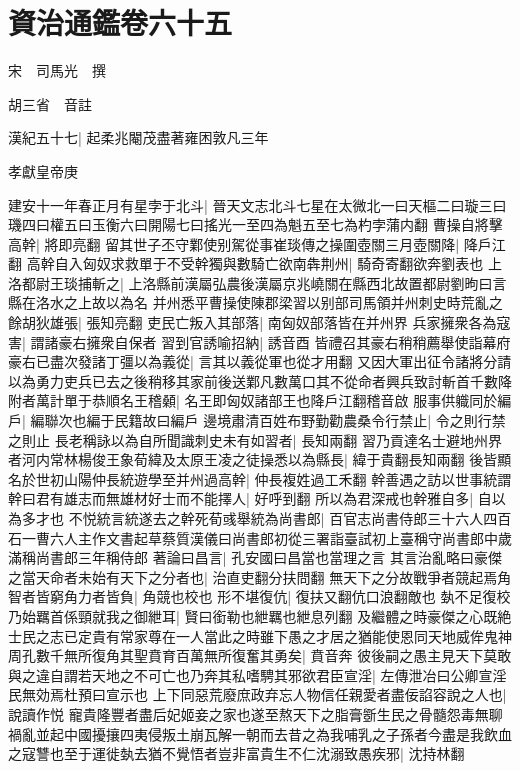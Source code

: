 \chapter{資治通鑑卷六十五}
宋　司馬光　撰

胡三省　音註

漢紀五十七|{
	起柔兆閹茂盡著雍困敦凡三年}


孝獻皇帝庚

建安十一年春正月有星孛于北斗|{
	晉天文志北斗七星在太微北一曰天樞二曰璇三曰璣四曰權五曰玉衡六曰開陽七曰搖光一至四為魁五至七為杓孛蒲内翻}
曹操自將擊高幹|{
	將即亮翻}
留其世子丕守鄴使别駕從事崔琰傳之操圍壺關三月壺關降|{
	降戶江翻}
高幹自入匈奴求救單于不受幹獨與數騎亡欲南犇荆州|{
	騎奇寄翻欲奔劉表也}
上洛都尉王琰捕斬之|{
	上洛縣前漢屬弘農後漢屬京兆嶢關在縣西北故置都尉劉昫曰言縣在洛水之上故以為名}
并州悉平曹操使陳郡梁習以别部司馬領并州刺史時荒亂之餘胡狄雄張|{
	張知亮翻}
吏民亡叛入其部落|{
	南匈奴部落皆在并州界}
兵家擁衆各為寇害|{
	謂諸豪右擁衆自保者}
習到官誘喻招納|{
	誘音酉}
皆禮召其豪右稍稍薦舉使詣幕府豪右已盡次發諸丁彊以為義從|{
	言其以義從軍也從才用翻}
又因大軍出征令諸將分請以為勇力吏兵已去之後稍移其家前後送鄴凡數萬口其不從命者興兵致討斬首千數降附者萬計單于恭順名王稽顙|{
	名王即匈奴諸部王也降戶江翻稽音啟}
服事供軄同於編戶|{
	編聯次也編于民籍故曰編戶}
邊境肅清百姓布野勤勸農桑令行禁止|{
	令之則行禁之則止}
長老稱詠以為自所聞識刺史未有如習者|{
	長知兩翻}
習乃貢達名士避地州界者河内常林楊俊王象荀緯及太原王凌之徒操悉以為縣長|{
	緯于貴翻長知兩翻}
後皆顯名於世初山陽仲長統遊學至并州過高幹|{
	仲長複姓過工禾翻}
幹善遇之訪以世事統謂幹曰君有雄志而無雄材好士而不能擇人|{
	好呼到翻}
所以為君深戒也幹雅自多|{
	自以為多才也}
不悦統言統遂去之幹死荀彧舉統為尚書郎|{
	百官志尚書侍郎三十六人四百石一曹六人主作文書起草蔡質漢儀曰尚書郎初從三署詣臺試初上臺稱守尚書郎中歲滿稱尚書郎三年稱侍郎}
著論曰昌言|{
	孔安國曰昌當也當理之言}
其言治亂略曰豪傑之當天命者未始有天下之分者也|{
	治直吏翻分扶問翻}
無天下之分故戰爭者競起焉角智者皆窮角力者皆負|{
	角競也校也}
形不堪復伉|{
	復扶又翻伉口浪翻敵也}
埶不足復校乃始羈首係頸就我之御紲耳|{
	賢曰銜勒也紲羈也紲息列翻}
及繼體之時豪傑之心既絶士民之志已定貴有常家尊在一人當此之時雖下愚之才居之猶能使恩同天地威侔鬼神周孔數千無所復角其聖賁育百萬無所復奮其勇矣|{
	賁音奔}
彼後嗣之愚主見天下莫敢與之違自謂若天地之不可亡也乃奔其私嗜騁其邪欲君臣宣淫|{
	左傳泄冶曰公卿宣淫民無効焉杜預曰宣示也}
上下同惡荒廢庶政弃忘人物信任親愛者盡佞諂容說之人也|{
	說讀作悦}
寵貴隆豐者盡后妃姬妾之家也遂至熬天下之脂膏斵生民之骨髓怨毒無聊禍亂並起中國擾攘四夷侵叛土崩瓦解一朝而去昔之為我哺乳之子孫者今盡是我飲血之寇讐也至于運徙埶去猶不覺悟者豈非富貴生不仁沈溺致愚疾邪|{
	沈持林翻}
